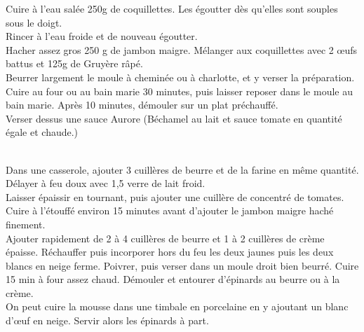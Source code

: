 \begin{minipage}[c]{\textwidth}
Cuire à l’eau salée 250g de coquillettes. Les égoutter dès qu’elles sont souples sous le doigt.\\
Rincer à l’eau froide et de nouveau égoutter. \\
Hacher assez gros 250 g de jambon maigre. Mélanger aux coquillettes avec 2 œufs battus et 125g de Gruyère râpé. \\
Beurrer largement le moule à cheminée ou à charlotte, et y verser la préparation. \\
Cuire au four ou au bain marie 30 minutes, puis laisser reposer dans le moule au bain marie. Après 10 minutes, démouler sur un plat préchauffé. \\
Verser dessus une sauce Aurore (Béchamel au lait et sauce tomate en quantité égale et chaude.)\\
\\

\end{minipage}

\begin{minipage}[c]{\textwidth}
Dans une casserole, ajouter 3 cuillères de beurre et de la farine en même quantité. Délayer à feu doux avec 1,5 verre de lait froid. \\
Laisser épaissir en tournant, puis ajouter une cuillère de concentré de tomates. \\
Cuire à l’étouffé environ 15 minutes avant d’ajouter le jambon maigre haché finement. \\
Ajouter rapidement  de 2 à 4 cuillères de beurre et 1 à 2 cuillères de crème épaisse. Réchauffer puis incorporer hors du feu les deux jaunes puis les deux blancs en neige ferme. Poivrer, puis verser dans un moule droit bien beurré. Cuire 15 min à four assez chaud. Démouler et entourer d’épinards au beurre ou à la crème. \\
On peut cuire la mousse dans une timbale en porcelaine en y ajoutant un blanc d’œuf en neige. Servir alors les épinards à part.\\
\\

\end{minipage}

